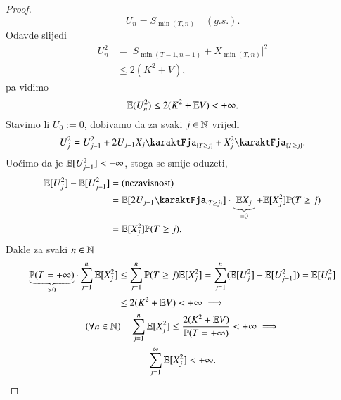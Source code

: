 \begin{proof}
    \begin{equation*}
        U_n = S_{\min (T, n)} \quad (g.s.).
    \end{equation*}
    Odavde slijedi
    \begin{equation*}
        \begin{aligned}
            U_n^2 &= \big| S_{\min (T - 1, n - 1)} + X_{\min (T, n)} \big|^2\\
            &\leq 2 (K^2 + V),
        \end{aligned}
    \end{equation*}
    pa vidimo
    \begin{equation*}
        \mathbb{E} (U_n^2) \leq 2 (K^2 + \mathbb{E} V) < +\infty.
    \end{equation*}
    Stavimo li $U_0 := 0$, dobivamo da za svaki $j \in \mathbb{N}$ vrijedi
    \begin{equation*}
        U_j^2 = U_{j - 1}^2 + 2 U_{j - 1} X_j \karaktFja_{\{ T \geq j \}} + X_j^2 \karaktFja_{\{ T \geq j \}}.
    \end{equation*}
    Uo\v cimo da je $\mathbb{E} [ U_{j - 1}^2 ] < + \infty$, stoga se smije oduzeti,
    \begin{equation*}
        \begin{aligned}
            \masE [U_j^2] - \masE [U_{j - 1}^2] &= (\textnormal{nezavisnost})\\
            &= \masE [2 U_{j - 1} \karaktFja_{\{ T \geq j \}}] \cdot \underbrace{\masE X_j}_{= 0} + \masE [X_j^2] \masP (T \geq j)\\
            &= \masE [X_j^2] \masP (T \geq j).
        \end{aligned}
    \end{equation*}
    Dakle za svaki $n \in \mathbb{N}$
    \begin{equation*}
        \begin{gathered}
            \begin{aligned}
                \underbrace{\mathbb{P} ( T = +\infty )}_{> 0} \cdot \sum\limits_{j = 1}^{n} \mathbb{E} [X_j^2] &\leq \sum\limits_{j = 1}^{n} \mathbb{P} (T \geq j) \mathbb{E} [X_j^2] = \sum\limits_{j = 1}^{n} (\mathbb{E} [U_j^2] - \mathbb{E} [U_{j - 1}^2]) = \mathbb{E} [U_n^2]\\
                &\leq 2(K^2 + \mathbb{E} V ) < +\infty \implies 
            \end{aligned}\\
            (\forall n \in \mathbb{N}) \quad \sum\limits_{j = 1}^{n} \mathbb{E} [X_j^2] \leq \frac{2 (K^2 + \mathbb{E} V)}{\mathbb{P} (T = +\infty)} < + \infty \implies\\
            \sum\limits_{j = 1}^{\infty} \mathbb{E} [X_j^2] < +\infty.
        \end{gathered}
    \end{equation*}
\end{proof}

